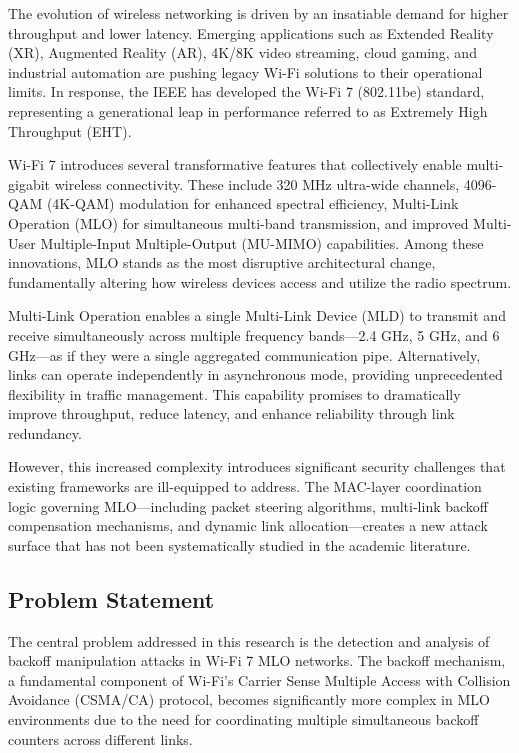 \documentclass[12pt,a4paper]{article}
\begin{document}
The evolution of wireless networking is driven by an insatiable demand for higher throughput and lower latency. Emerging applications such as Extended Reality (XR), Augmented Reality (AR), 4K/8K video streaming, cloud gaming, and industrial automation are pushing legacy Wi-Fi solutions to their operational limits. In response, the IEEE has developed the Wi-Fi 7 (802.11be) standard, representing a generational leap in performance referred to as Extremely High Throughput (EHT).

Wi-Fi 7 introduces several transformative features that collectively enable multi-gigabit wireless connectivity. These include 320 MHz ultra-wide channels, 4096-QAM (4K-QAM) modulation for enhanced spectral efficiency, Multi-Link Operation (MLO) for simultaneous multi-band transmission, and improved Multi-User Multiple-Input Multiple-Output (MU-MIMO) capabilities. Among these innovations, MLO stands as the most disruptive architectural change, fundamentally altering how wireless devices access and utilize the radio spectrum.

Multi-Link Operation enables a single Multi-Link Device (MLD) to transmit and receive simultaneously across multiple frequency bands---2.4 GHz, 5 GHz, and 6 GHz---as if they were a single aggregated communication pipe. Alternatively, links can operate independently in asynchronous mode, providing unprecedented flexibility in traffic management. This capability promises to dramatically improve throughput, reduce latency, and enhance reliability through link redundancy.

However, this increased complexity introduces significant security challenges that existing frameworks are ill-equipped to address. The MAC-layer coordination logic governing MLO---including packet steering algorithms, multi-link backoff compensation mechanisms, and dynamic link allocation---creates a new attack surface that has not been systematically studied in the academic literature.

\subsection{Problem Statement}

The central problem addressed in this research is the detection and analysis of backoff manipulation attacks in Wi-Fi 7 MLO networks. The backoff mechanism, a fundamental component of Wi-Fi's Carrier Sense Multiple Access with Collision Avoidance (CSMA/CA) protocol, becomes significantly more complex in MLO environments due to the need for coordinating multiple simultaneous backoff counters across different links.
\end{document}
